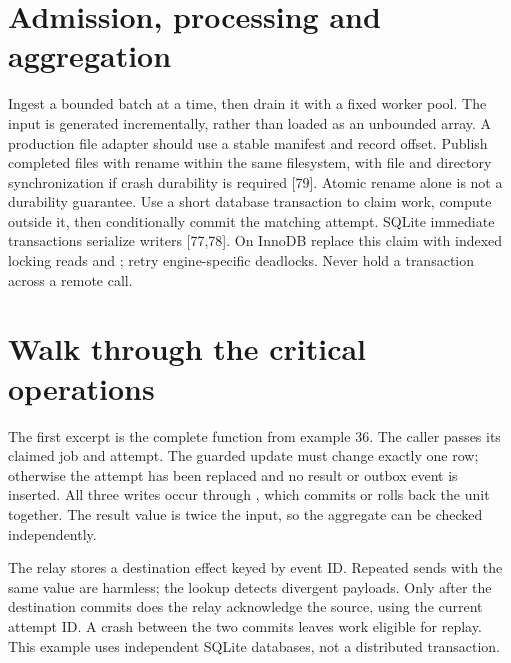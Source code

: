 \section{Admission, processing and aggregation}
Ingest a bounded batch at a time, then drain it with a fixed worker pool.
The input is generated incrementally, rather than loaded as an unbounded
array. A production file adapter should use a stable manifest and record
offset. Publish completed files with rename within the same filesystem,
with file and directory synchronization if crash durability is required
[79]. Atomic rename alone is not a durability guarantee.
Use a short database transaction to claim work, compute outside it,
then conditionally commit the matching attempt. SQLite immediate
transactions serialize writers [77,78]. On InnoDB replace this claim
with indexed locking reads and ; retry engine-specific
deadlocks. Never hold a transaction across a remote call.

\section{Walk through the critical operations}
The first excerpt is the complete  function from example 36.
The caller passes its claimed job and attempt. The guarded update must
change exactly one row; otherwise the attempt has been replaced and no
result or outbox event is inserted. All three writes occur through
, which commits or rolls back the unit together. The result value
is twice the input, so the aggregate can be checked independently.

The relay stores a destination effect keyed by event ID. Repeated sends
with the same value are harmless; the lookup detects divergent payloads.
Only after the destination commits does the relay acknowledge the source,
using the current attempt ID. A crash between the two commits leaves
work eligible for replay. This example uses independent SQLite databases,
not a distributed transaction.

